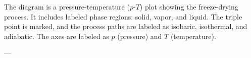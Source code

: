 The diagram is a pressure-temperature (\( p \)-\( T \)) plot showing the freeze-drying process. It includes labeled phase regions: solid, vapor, and liquid. The triple point is marked, and the process paths are labeled as isobaric, isothermal, and adiabatic. The axes are labeled as \( p \) (pressure) and \( T \) (temperature).

---